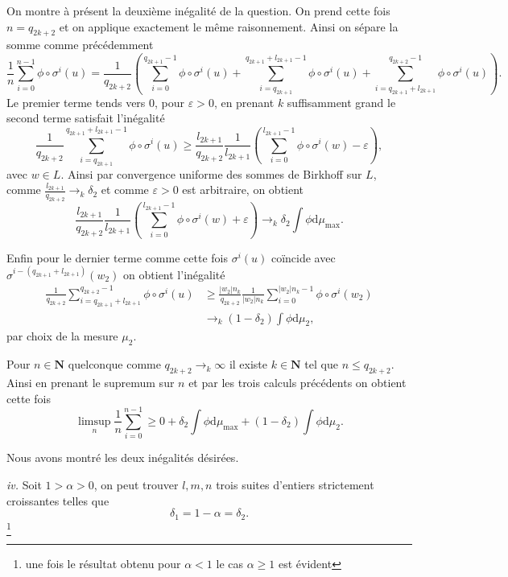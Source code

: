 \documentclass[12pt]{article}
\newcommand{\N}{\mathbf{N}}
\newcommand{\de}{\mathrm{d}}
\begin{document}
On montre à présent la deuxième inégalité de la question. On prend cette fois $n = q_{2k+2}$ et on applique exactement le même raisonnement.
Ainsi on sépare la somme comme précédemment \[
        \frac{1}{n}\sum_{i=0}^{n-1} \phi\circ\sigma^{i}(u) = \frac{1}{q_{2k+2}}(\sum_{i=0}^{q_{2k+1}-1} \phi\circ\sigma^{i}(u) + \sum_{i=q_{2k+1}}^{q_{2k+1}+l_{2k+1}-1} \phi\circ\sigma^{i}(u) + \sum_{i=q_{2k+1}+l_{2k+1}}^{q_{2k+2}-1} \phi\circ\sigma^{i}(u))
.\] 
Le premier terme tends vers 0, pour $\varepsilon > 0$, en prenant $k$ suffisamment grand le second terme satisfait l'inégalité \[
        \frac{1}{q_{2k+2}}\sum_{i=q_{2k+1}}^{q_{2k+1}+l_{2k+1}-1} \phi\circ\sigma^{i}(u) \ge \frac{l_{2k+1}}{q_{2k+2}}\frac{1}{l_{2k+1}}(\sum_{i=0}^{l_{2k+1}-1} \phi\circ\sigma^{i}(w) - \varepsilon) 
,\] avec $w \in L$. Ainsi par convergence uniforme des sommes de Birkhoff sur $L$, comme $\frac{l_{2k+1}}{q_{2k+2}}\to_{k}\delta_{2}$ et comme $\varepsilon > 0$ est arbitraire, on obtient  \[
\frac{l_{2k+1}}{q_{2k+2}}\frac{1}{l_{2k+1}}(\sum_{i=0}^{l_{2k+1}-1} \phi\circ\sigma^{i}(w) + \varepsilon) \to_{k} \delta_{2}\int\phi\de\mu_{\max} 
.\] 

Enfin pour le dernier terme comme cette fois $\sigma^{i}(u)$ coïncide avec $\sigma^{i-(q_{2k+1}+l_{2k+1})}(w_{2})$ on obtient l'inégalité
\begin{align*}
        \frac{1}{q_{2k+2}}\sum_{i=q_{2k+1}+l_{2k+1}}^{q_{2k+2}-1} \phi\circ\sigma^{i}(u) &\ge \frac{|w_{2}|n_{k}}{q_{2k+2}}\frac{1}{|w_{2}|n_{k}}\sum_{i=0}^{|w_{2}|n_{k}-1} \phi\circ\sigma^{i}(w_{2}) \\
                                                                                     &\to_{k}(1-\delta_{2})\int\phi\de\mu_{2}
,\end{align*} par choix de la mesure $\mu_{2}$.

Pour $n \in \N$ quelconque comme $q_{2k+2}\to_{k}\infty$ il existe $k \in \N$ tel que $n \le q_{2k+2}$. Ainsi en prenant le supremum sur $n$ et par les trois calculs précédents on obtient cette fois  \[
        \limsup_{n}\frac{1}{n}\sum_{i=0}^{n-1} \ge 0 + \delta_{2}\int\phi\de\mu_{\max} + (1-\delta_{2})\int\phi\de\mu_{2}
.\]

Nous avons montré les deux inégalités désirées.
\medskip

\textit{iv.} Soit $1 > \alpha > 0$, on peut trouver $l, m, n$ trois suites d'entiers strictement croissantes telles que  \[
\delta_{1} = 1 - \alpha = \delta_{2}
.\]\footnote{une fois le résultat obtenu pour $\alpha < 1$ le cas $\alpha \ge 1$ est évident}
\end{document}
